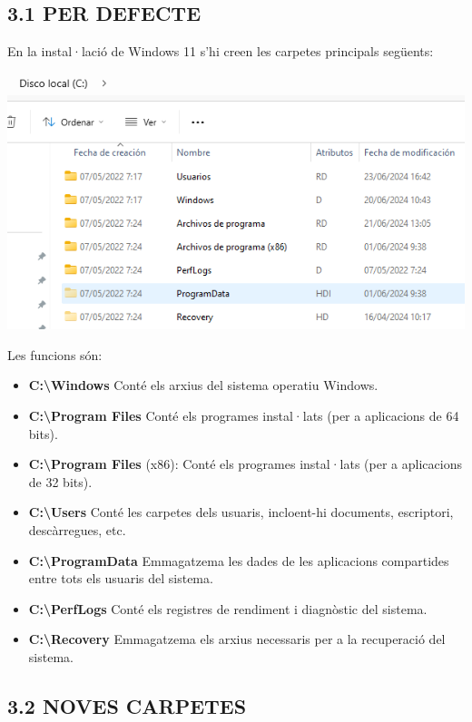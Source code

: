 \documentclass[
  a4paper,
]{article}
\providecommand{\tightlist}{%
  \setlength{\itemsep}{0pt}\setlength{\parskip}{0pt}}
\begin{document}
\subsection{3.1 PER DEFECTE}\label{per-defecte}

En la instal·lació de Windows 11 s'hi creen les carpetes principals
següents:

\includegraphics{png/carpetesPrincipals.png}

Les funcions són:

\begin{itemize}
\tightlist
\item
  \textbf{C:\textbackslash Windows} Conté els arxius del sistema
  operatiu Windows.
\item
  \textbf{C:\textbackslash Program Files} Conté els programes
  instal·lats (per a aplicacions de 64 bits).
\item
  \textbf{C:\textbackslash Program Files} (x86): Conté els programes
  instal·lats (per a aplicacions de 32 bits).
\item
  \textbf{C:\textbackslash Users} Conté les carpetes dels usuaris,
  incloent-hi documents, escriptori, descàrregues, etc.
\item
  \textbf{C:\textbackslash ProgramData} Emmagatzema les dades de les
  aplicacions compartides entre tots els usuaris del sistema.
\item
  \textbf{C:\textbackslash PerfLogs} Conté els registres de rendiment i
  diagnòstic del sistema.
\item
  \textbf{C:\textbackslash Recovery} Emmagatzema els arxius necessaris
  per a la recuperació del sistema.
\end{itemize}

\subsection{3.2 NOVES CARPETES}\label{noves-carpetes}
\end{document}
